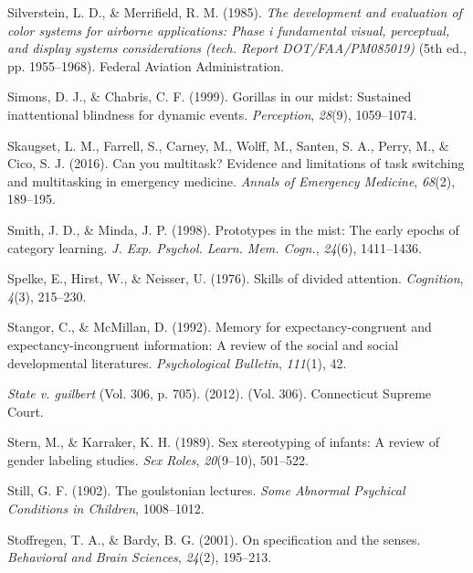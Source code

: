 \documentclass[
]{krantz}
\newlength{\cslhangindent}
\newlength{\cslentryspacingunit} %
\newenvironment{CSLReferences}[2] %
 {%
  \setlength{\parindent}{0pt}
  \ifodd #1
  \let\oldpar\par
  \def\par{\hangindent=\cslhangindent\oldpar}
  \fi
  \setlength{\parskip}{#2\cslentryspacingunit}
 }%
 {}
\begin{document}
\begin{CSLReferences}{1}{0}
\leavevmode{}%
Silverstein, L. D., \& Merrifield, R. M. (1985). \emph{The development and evaluation of color systems for airborne applications: Phase i fundamental visual, perceptual, and display systems considerations (tech. Report DOT/FAA/PM085019)} (5th ed., pp. 1955--1968). Federal Aviation Administration.

\leavevmode{}%
Simons, D. J., \& Chabris, C. F. (1999). Gorillas in our midst: Sustained inattentional blindness for dynamic events. \emph{Perception}, \emph{28}(9), 1059--1074.

\leavevmode{}%
Skaugset, L. M., Farrell, S., Carney, M., Wolff, M., Santen, S. A., Perry, M., \& Cico, S. J. (2016). Can you multitask? Evidence and limitations of task switching and multitasking in emergency medicine. \emph{Annals of Emergency Medicine}, \emph{68}(2), 189--195.

\leavevmode{}%
Smith, J. D., \& Minda, J. P. (1998). Prototypes in the mist: The early epochs of category learning. \emph{J. Exp. Psychol. Learn. Mem. Cogn.}, \emph{24}(6), 1411--1436.

\leavevmode{}%
Spelke, E., Hirst, W., \& Neisser, U. (1976). Skills of divided attention. \emph{Cognition}, \emph{4}(3), 215--230.

\leavevmode{}%
Stangor, C., \& McMillan, D. (1992). Memory for expectancy-congruent and expectancy-incongruent information: A review of the social and social developmental literatures. \emph{Psychological Bulletin}, \emph{111}(1), 42.

\leavevmode{}%
\emph{State v. guilbert} (Vol. 306, p. 705). (2012). (Vol. 306). Connecticut Supreme Court.

\leavevmode{}%
Stern, M., \& Karraker, K. H. (1989). Sex stereotyping of infants: A review of gender labeling studies. \emph{Sex Roles}, \emph{20}(9--10), 501--522.

\leavevmode{}%
Still, G. F. (1902). The goulstonian lectures. \emph{Some Abnormal Psychical Conditions in Children}, 1008--1012.

\leavevmode{}%
Stoffregen, T. A., \& Bardy, B. G. (2001). On specification and the senses. \emph{Behavioral and Brain Sciences}, \emph{24}(2), 195--213.


\end{CSLReferences}
\end{document}
